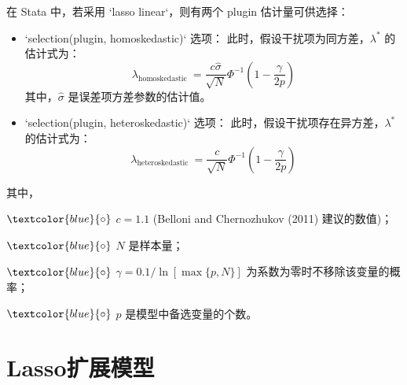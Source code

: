 

在 Stata 中，若采用 `lasso linear`，则有两个 plugin 估计量可供选择：
\begin{itemize}
\item `selection(plugin, homoskedastic)` 选项：
此时，假设干扰项为同方差，$\lambda^*$ 的估计式为：
\begin{equation}\label{eq:lasso-plugin-01}
	\lambda_{\text {homoskedastic }}=\frac{c \widehat{\sigma}}{\sqrt{N}} \Phi^{-1}\left(1-\frac{\gamma}{2 p}\right)
\end{equation}
其中，$\widehat{\sigma}$ 是误差项方差参数的估计值。
\item `selection(plugin, heteroskedastic)` 选项：
此时，假设干扰项存在异方差，$\lambda^*$ 的估计式为：
\begin{equation}\label{eq:lasso-plugin-02}
\lambda_{\text {heteroskedastic }}=\frac{c}{\sqrt{N}} \Phi^{-1}\left(1-\frac{\gamma}{2 p}\right)
\end{equation}
\end{itemize}
其中，

$\textcolor{blue}{\circ}$ $c=1.1$ (Belloni and Chernozhukov (2011) 建议的数值)；

$\textcolor{blue}{\circ}$ $N$ 是样本量；

$\textcolor{blue}{\circ}$ $\gamma=0.1 / \ln [\max \{p, N\}]$ 为系数为零时不移除该变量的概率；

$\textcolor{blue}{\circ}$ $p$ 是模型中备选变量的个数。

\vspace{5pt}





\section{Lasso扩展模型}

